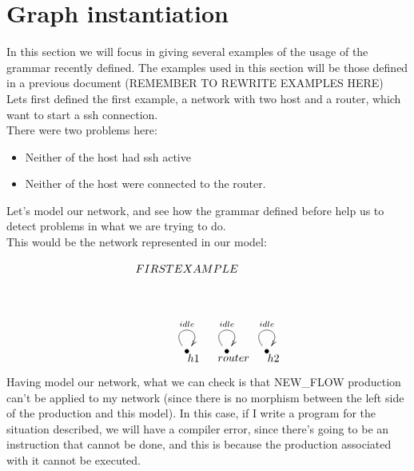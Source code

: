 \documentclass[envcountsect,runningheads]{llncs}
\begin{document}
\section{Graph instantiation}

In this section we will focus in giving several examples of the usage of the 
grammar recently defined. The examples used in this section will be those defined in 
a previous document (REMEMBER TO REWRITE EXAMPLES HERE) \\ 
Lets first defined the first example, a network with two host and a router, 
which want to start a ssh connection. \\
There were two problems here:
\begin{itemize}
  \item Neither of the host had ssh active
  \item Neither of the host were connected to the router.
\end{itemize}

Let's model our network, and see how the grammar defined before help us to 
detect problems in what we are trying to do.\\
This would be the network represented in our model:
\begin{figure}[H]
    \[
       \xymatrix@C=25pt@R=30pt
       {
         {}\POS[]-<0pc,0pc>\drop{FIRST EXAMPLE}
         \\
         \\
         {\bullet}\ar@(ul,ur)^{idle} \POS[]-<-.5pc,.5pc> \drop{h1} &
         {\bullet}\ar@(ul,ur)^{idle} \POS[]-<-.5pc,.5pc> \drop{router} &
         {\bullet}\ar@(ul,ur)^{idle} \POS[]-<-.5pc,.5pc> \drop{h2}
      }
    \]
\end{figure}

Having model our network, what we can check is that NEW\_FLOW production can't be 
applied to my network (since there is no morphism between the left side of the production 
and this model). In this case, if I write a program for the situation described, 
we will have a compiler error, since there's going to be an instruction that 
cannot be done, and this is because the production associated with it cannot be 
executed.
\end{document}
